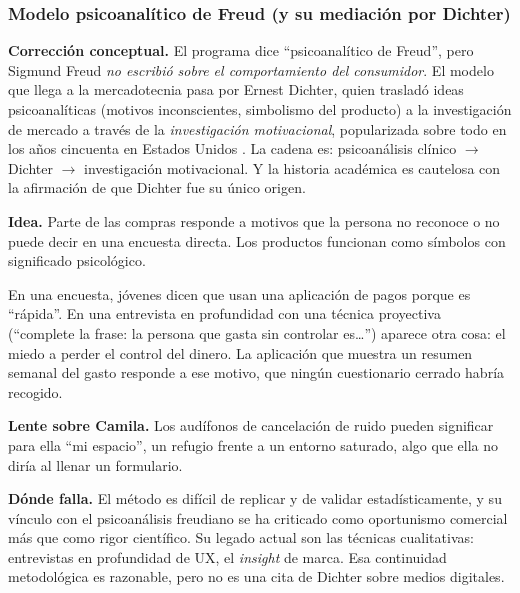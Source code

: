 \subsubsection{Modelo psicoanalítico de Freud (y su mediación por Dichter)}
\label{sec:cap09-freud}

\begin{cajaAtencion}
\textbf{Corrección conceptual.} El programa dice \enquote{psicoanalítico de
Freud}, pero Sigmund Freud \emph{no escribió sobre el comportamiento del
consumidor}. El modelo que llega a la mercadotecnia pasa por Ernest Dichter,
quien trasladó ideas psicoanalíticas (motivos inconscientes, simbolismo del
producto) a la investigación de mercado a través de la \emph{investigación
motivacional}, popularizada sobre todo en los años cincuenta en Estados Unidos
\parencite{dichter1960,schwarzkopf2015dichter}. La cadena es: psicoanálisis
clínico $\rightarrow$ Dichter $\rightarrow$ investigación motivacional. Y la
historia académica es cautelosa con la afirmación de que Dichter fue su único
origen.
\end{cajaAtencion}

\textbf{Idea.} Parte de las compras responde a motivos que la persona no
reconoce o no puede decir en una encuesta directa. Los productos funcionan como
símbolos con significado psicológico.

\begin{cajaEjemplo}[title={Ejemplo: la aplicación de pagos}]
En una encuesta, jóvenes dicen que usan una aplicación de pagos porque es
\enquote{rápida}. En una entrevista en profundidad con una técnica proyectiva
(\enquote{complete la frase: la persona que gasta sin controlar es\ldots})
aparece otra cosa: el miedo a perder el control del dinero. La aplicación que
muestra un resumen semanal del gasto responde a ese motivo, que ningún
cuestionario cerrado habría recogido.
\end{cajaEjemplo}

\textbf{Lente sobre Camila.} Los audífonos de cancelación de ruido pueden
significar para ella \enquote{mi espacio}, un refugio frente a un entorno
saturado, algo que ella no diría al llenar un formulario.

\textbf{Dónde falla.} El método es difícil de replicar y de validar
estadísticamente, y su vínculo con el psicoanálisis freudiano se ha criticado
como oportunismo comercial más que como rigor científico. Su legado actual
son las técnicas cualitativas: entrevistas en profundidad de UX, el
\textit{insight} de marca. Esa continuidad metodológica es razonable, pero no es
una cita de Dichter sobre medios digitales.

